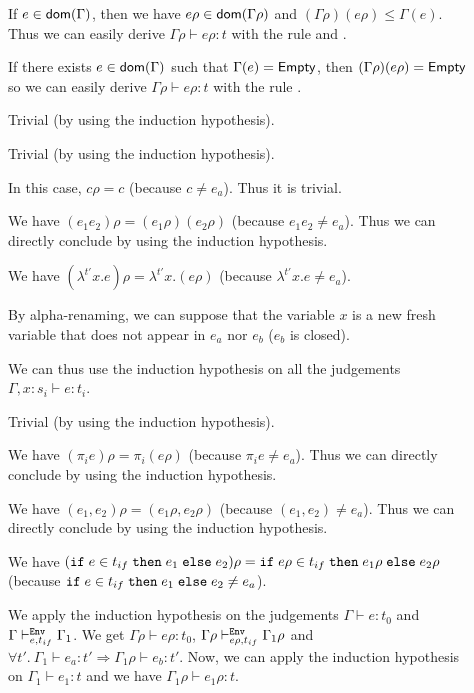 \documentclass[a4paper]{article}
\theoremstyle{definition}
\begin{document}
        \begin{description}
          \item[] If $e\in\textsf{dom}(\Gamma)$, then we have $e\rho\in\textsf{dom}(\Gamma\rho)$ and $(\Gamma\rho)(e\rho)\leq\Gamma(e)$.
          Thus we can easily derive $\Gamma\rho\vdash e\rho:t$ with the rule  and .
          \item[] If there exists $e\in\textsf{dom}(\Gamma)$ such that $\Gamma(e)=\textsf{Empty}$, then $(\Gamma\rho)(e\rho)=\textsf{Empty}$
          so we can easily derive $\Gamma\rho\vdash e\rho:t$ with the rule .
          \item[] Trivial (by using the induction hypothesis).
          \item[] Trivial (by using the induction hypothesis).
          \item[] In this case, $c\rho = c$ (because $c \neq e_a$). Thus it is trivial.
          \item[] We have $(e_1 e_2)\rho = (e_1\rho) (e_2\rho)$ (because $e_1 e_2 \neq e_a$).
          Thus we can directly conclude by using the induction hypothesis.
          \item[] We have $(\lambda^{t'}x.e)\rho = \lambda^{t'}x.(e\rho)$ (because $\lambda^{t'}x.e \neq e_a$).
          
          By alpha-renaming, we can suppose that the variable $x$ is a new fresh variable that does not appear
          in $e_a$ nor $e_b$ ($e_b$ is closed).
          
          We can thus use the induction hypothesis on all the judgements $\Gamma, x:s_i \vdash e:t_i$.
          \item[] Trivial (by using the induction hypothesis).
          \item[] We have $(\pi_i e)\rho = \pi_i (e\rho)$ (because $\pi_i e \neq e_a$).
          Thus we can directly conclude by using the induction hypothesis.
          \item[] We have $(e_1,e_2)\rho = (e_1\rho,e_2\rho)$ (because $(e_1,e_2) \neq e_a$).
          Thus we can directly conclude by using the induction hypothesis.
          \item[]
          We have $(\texttt{if}\;e\in t_{if}\;\texttt{then}\;e_1\;\texttt{else}\;e_2)\rho = \texttt{if}\;e\rho\in t_{if}\;\texttt{then}\;e_1\rho\;\texttt{else}\;e_2\rho$ (because $\texttt{if}\;e\in t_{if}\;\texttt{then}\;e_1\;\texttt{else}\;e_2 \neq e_a$).

          We apply the induction hypothesis on the judgements $\Gamma\vdash e:t_0$ and $\Gamma\vdash^{\texttt{Env}}_{e,t_{if}} \Gamma_1$.
          We get $\Gamma\rho\vdash e\rho:t_0$, $\Gamma\rho\vdash^{\texttt{Env}}_{e\rho,t_{if}} \Gamma_1\rho$ and
          $\forall t'.\ \Gamma_1 \vdash e_a : t' \Rightarrow \Gamma_1\rho \vdash e_b:t'$.
          Now, we can apply the induction hypothesis on $\Gamma_1\vdash e_1:t$ and we have $\Gamma_1\rho\vdash e_1\rho:t$.


\end{description}
\end{document}
